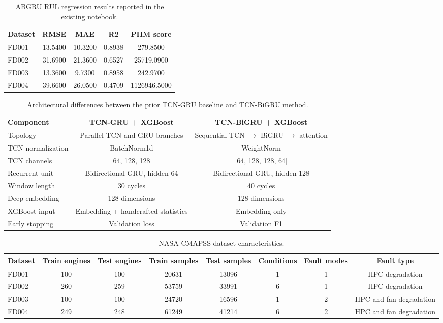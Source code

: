 \begin{table}[!t]
\centering
\caption{ABGRU RUL regression results reported in the existing notebook.}
\label{tab:abgru\_regression}
\begin{tabular}{lcccc}
\hline
Dataset & RMSE & MAE & R2 & PHM score \\
\hline
FD001 & 13.5400 & 10.3200 & 0.8938 & 279.8500 \\
FD002 & 31.6900 & 21.3600 & 0.6527 & 25719.0900 \\
FD003 & 13.3600 & 9.7300 & 0.8958 & 242.9700 \\
FD004 & 39.6600 & 26.0500 & 0.4709 & 1126946.5000 \\
\hline
\end{tabular}
\end{table}

\begin{table}[!t]
\centering
\caption{Architectural differences between the prior TCN-GRU baseline and TCN-BiGRU method.}
\label{tab:architecture\_comparison}
\begin{tabular}{lcc}
\hline
Component & TCN-GRU + XGBoost & TCN-BiGRU + XGBoost \\
\hline
Topology & Parallel TCN and GRU branches & Sequential TCN $\rightarrow$ BiGRU $\rightarrow$ attention \\
TCN normalization & BatchNorm1d & WeightNorm \\
TCN channels & [64, 128, 128] & [64, 128, 128, 64] \\
Recurrent unit & Bidirectional GRU, hidden 64 & Bidirectional GRU, hidden 128 \\
Window length & 30 cycles & 40 cycles \\
Deep embedding & 128 dimensions & 128 dimensions \\
XGBoost input & Embedding + handcrafted statistics & Embedding only \\
Early stopping & Validation loss & Validation F1 \\
\hline
\end{tabular}
\end{table}

\begin{table}[!t]
\centering
\caption{NASA CMAPSS dataset characteristics.}
\label{tab:dataset\_characteristics}
\begin{tabular}{lccccccc}
\hline
Dataset & Train engines & Test engines & Train samples & Test samples & Conditions & Fault modes & Fault type \\
\hline
FD001 & 100 & 100 & 20631 & 13096 & 1 & 1 & HPC degradation \\
FD002 & 260 & 259 & 53759 & 33991 & 6 & 1 & HPC degradation \\
FD003 & 100 & 100 & 24720 & 16596 & 1 & 2 & HPC and fan degradation \\
FD004 & 249 & 248 & 61249 & 41214 & 6 & 2 & HPC and fan degradation \\
\hline
\end{tabular}
\end{table}

